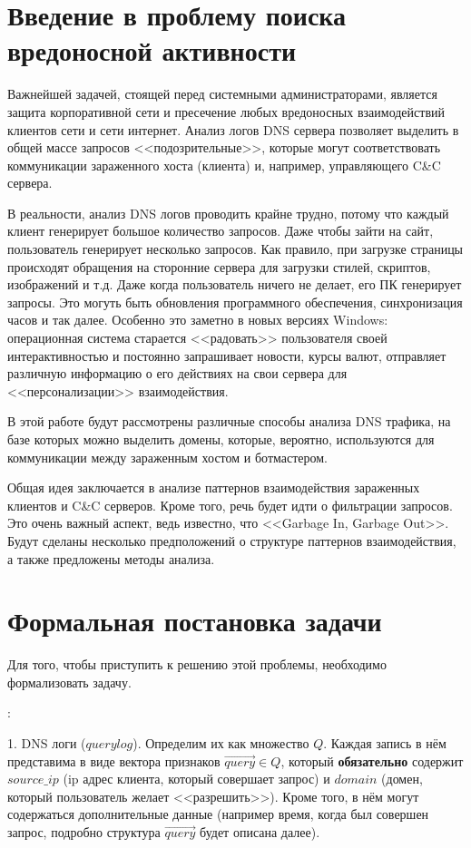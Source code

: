 \documentclass[14pt]{extreport}
\begin{document}
\newpage
    \chapter{Введение в проблему поиска вредоносной активности}

Важнейшей задачей, стоящей перед системными администраторами, является защита корпоративной сети и пресечение любых вредоносных взаимодействий клиентов сети и сети интернет. Анализ логов DNS сервера позволяет выделить в общей массе запросов <<подозрительные>>, которые могут соответствовать коммуникации зараженного хоста (клиента) и, например, управляющего C\&C сервера.

В реальности, анализ DNS логов проводить крайне трудно, потому что каждый клиент генерирует большое количество запросов. Даже чтобы зайти на сайт, пользователь генерирует несколько запросов. Как правило, при загрузке страницы происходят обращения на сторонние сервера для загрузки стилей, скриптов, изображений и т.д. Даже когда пользователь ничего не делает, его ПК генерирует запросы. Это могуть быть обновления программного обеспечения, синхронизация часов и так далее. Особенно это заметно в новых версиях Windows: операционная система старается <<радовать>> пользователя своей интерактивностью и постоянно запрашивает новости, курсы валют, отправляет различную информацию о его действиях на свои сервера для <<персонализации>> взаимодействия.

В этой работе будут рассмотрены различные способы анализа DNS трафика, на базе которых можно выделить домены, которые, вероятно, используются для коммуникации между зараженным хостом и ботмастером.

\newpage
Общая идея заключается в анализе паттернов взаимодействия зараженных клиентов и C\&C серверов. Кроме того, речь будет идти о фильтрации запросов. Это очень важный аспект, ведь известно, что <<Garbage In, Garbage Out>>. Будут сделаны несколько предположений о структуре паттернов взаимодействия, а также предложены методы анализа.

\chapter{Формальная постановка задачи}
	Для того, чтобы приступить к решению этой проблемы, необходимо формализовать задачу.
	
	{:}
		
		1. DNS логи ($querylog$). Определим их как множество $Q$. Каждая запись в нём представима в виде вектора признаков $\vec{query}$$\in$$Q$, который \textbf{обязательно} содержит $source\_ip$ (ip адрес клиента, который совершает запрос) и $domain$ (домен, который пользователь желает <<разрешить>>). Кроме того, в нём могут содержаться дополнительные данные (например время, когда был совершен запрос, подробно структура $\vec{query}$ будет описана далее).
		
\end{document}
